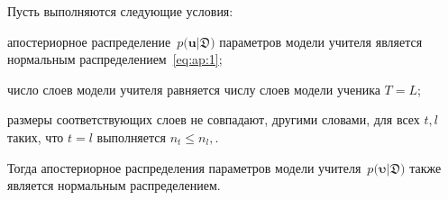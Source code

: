 \documentclass[12pt]{a&t}
\begin{document}
\begin{theorem}
\label{theorem:ap:neural}
Пусть выполняются следующие условия:
\begin{enumlist}
\item апостериорное распределение~$p\bigr(\mathbf{u}|\mathfrak{D}\bigr)$ параметров модели учителя является нормальным распределением~\eqref{eq:ap:1};
\item число слоев модели учителя равняется числу слоев модели ученика $T=L$;
\item размеры соответствующих слоев не совпадают, другими словами, для всех $t, l$ таких, что $t=l$ выполняется $n_t \leq n_l,$.
\end{enumlist}
Тогда апостериорное распределения параметров модели учителя~$p\bigr(\bm{\upsilon}|\mathfrak{D}\bigr)$ также является нормальным распределением.
\end{theorem}
\end{document}
